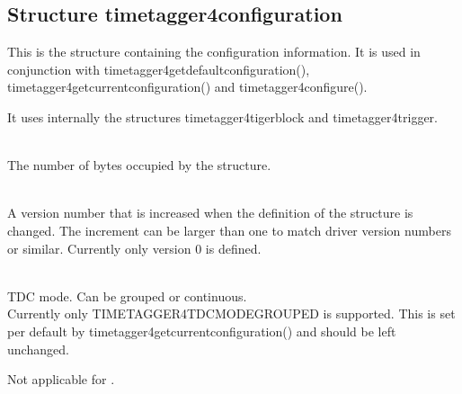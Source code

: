 		\subsection{Structure timetagger4\tu configuration}

			This is the structure containing the configuration information. It is used in conjunction with \textsf{timetagger4\tu get\tu default\tu configuration()}, \textsf{timetagger4\tu get\tu current\tu configuration()} and \textsf{timetagger4\tu configure()}.\par

			It uses internally the structures \textsf{timetagger4\tu tiger\tu block} and \textsf{timetagger4\tu trigger}.\par

			\\
			The number of bytes occupied by the structure.\par

			\\
			A version number that is increased when the definition of the structure is changed. The increment can be larger than one to match driver version numbers or similar. Currently only version 0 is defined.\par

			\\
			TDC mode. Can be grouped or continuous. \\
			Currently only TIMETAGGER4\tu TDC\tu MODE\tu GROUPED is supported. This is set per default by timetagger4\tu get\tu current\tu configuration() and should be left unchanged.\par

			 Not applicable for \deviceName.

